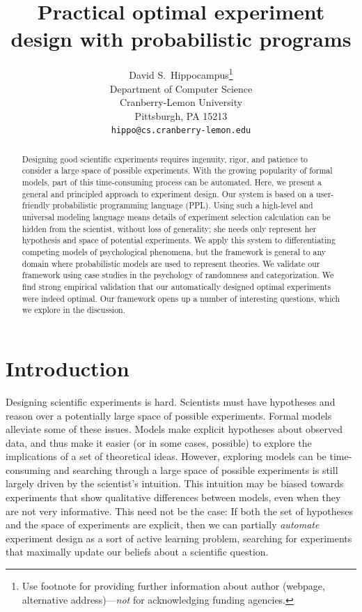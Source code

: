 \documentclass{article}
\title{Practical optimal experiment design with probabilistic programs}
\author{
  David S.~Hippocampus\thanks{Use footnote for providing further
    information about author (webpage, alternative
    address)---\emph{not} for acknowledging funding agencies.} \\
  Department of Computer Science\\
  Cranberry-Lemon University\\
  Pittsburgh, PA 15213 \\
  \texttt{hippo@cs.cranberry-lemon.edu} \\
}
\newcommand{\ndg}[1]{\textcolor{Green}{[ndg: #1]}}
\newcommand{\mht}[1]{\textcolor{Blue}{[mht: #1]}}
\newcommand{\lou}[1]{\textcolor{orange}{[lou: #1]}}
\begin{document}

\maketitle

\begin{abstract}

Designing good scientific experiments requires ingenuity, rigor, and patience to consider a large space of possible experiments.
With the growing popularity of formal models, part of this time-consuming process can be automated.
Here, we present a general and principled approach to experiment design.
Our system is based on a user-friendly probabilistic programming language (PPL).
Using such a high-level and universal modeling language means details of experiment selection calculation can be hidden from the scientist, without loss of generality; she needs only represent her hypothesis and space of potential experiments.
We apply this system to differentiating competing models of psychological phenomena, but the framework is general to any domain where probabilistic models are used to represent theories.
We validate our framework using case studies in the psychology of randomness and categorization.
We find strong empirical validation that our automatically designed optimal experiments were indeed optimal.
Our framework opens up a number of interesting questions, which we explore in the discussion.


\end{abstract}


\section{Introduction}
Designing scientific experiments is hard.
Scientists must have hypotheses and reason over a potentially large space of possible experiments.
Formal models alleviate some of these issues.
Models make explicit hypotheses about observed data, and thus make it easier (or in some cases, possible) to explore the implications of a set of theoretical ideas.
However, exploring models can be time-consuming and searching through a large space of possible experiments is still largely driven by the scientist's intuition.
This intuition may be biased towards experiments that show qualitative differences between models, even when they are not very informative.
This need not be the case: If both the set of hypotheses and the space of experiments are explicit, then we can partially \emph{automate} experiment design as a sort of active learning problem, searching for experiments that maximally update our beliefs about a scientific question.
\end{document}
